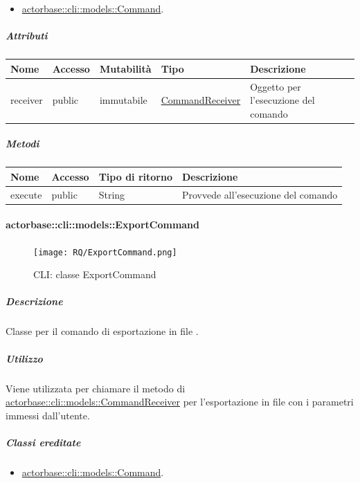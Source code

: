 \documentclass{scalatekids-article}
\begin{document}
\begin{itemize}
\item \hyperref[sec:actorbase::cli::models::Command]{actorbase::cli::models::Command}.
\end{itemize}

\subparagraph{Attributi}

\begin{tabular}{| p{1cm} | p{1.5cm} | p{2cm} | p{4cm} | p{8.5cm} |}
  \hline
  Nome & Accesso & Mutabilità & Tipo & Descrizione\\
  \hline
  receiver & public & immutabile & \hyperref[sec:actorbase::cli::models::CommandReceiver]{CommandReceiver} & Oggetto per l'esecuzione del comando\\
  \hline
\end{tabular}

\subparagraph{Metodi}

\begin{tabular}{| l | l | l | l |}
  \hline
  Nome & Accesso & Tipo di ritorno & Descrizione\\
  \hline
  execute & public & String & Provvede all'esecuzione del comando\\
  \hline
\end{tabular}

\paragraph{actorbase::cli::models::ExportCommand}
\label{sec:actorbase::cli::models::ExportCommand}

\begin{figure}[H]
  \begin{center}
    \texttt{[image: RQ/ExportCommand.png]}
    \caption{CLI: classe ExportCommand}
  \end{center}
\end{figure}

\subparagraph{Descrizione}

Classe per il comando di esportazione in file .

\subparagraph{Utilizzo}

Viene utilizzata per chiamare il metodo di
\hyperref[sec:actorbase::cli::models::CommandReceiver]{actorbase::cli::models::CommandReceiver} per l'esportazione in file
 con i parametri immessi dall'utente.

\subparagraph{Classi ereditate}

\begin{itemize}
\item \hyperref[sec:actorbase::cli::models::Command]{actorbase::cli::models::Command}.
\end{itemize}
\end{document}
